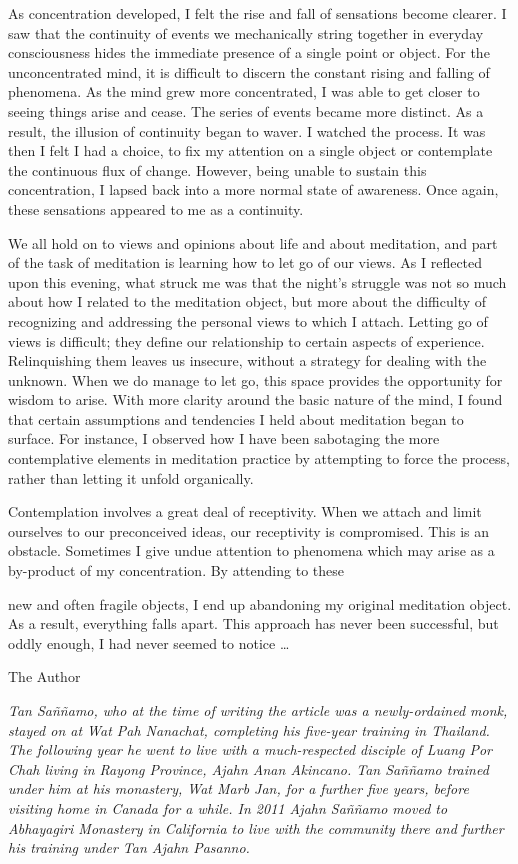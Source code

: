 As concentration developed, I felt the rise and fall of sensations
become clearer. I saw that the continuity of events we mechanically
string together in everyday consciousness hides the immediate presence
of a single point or object. For the unconcentrated mind, it is
difficult to discern the constant rising and falling of phenomena. As
the mind grew more concentrated, I was able to get closer to seeing
things arise and cease. The series of events became more distinct. As a
result, the illusion of continuity began to waver. I watched the
process. It was then I felt I had a choice, to fix my attention on a
single object or contemplate the continuous flux of change. However, 
being unable to sustain this concentration, I lapsed back into a more
normal state of awareness. Once again, these sensations appeared to me
as a continuity. 

We all hold on to views and opinions about life and about meditation, 
and part of the task of meditation is learning how to let go of our
views. As I reflected upon this evening, what struck me was that the
night's struggle was not so much about how I related to the meditation
object, but more about the difficulty of recognizing and addressing the
personal views to which I attach. Letting go of views is difficult; they
define our relationship to certain aspects of experience. Relinquishing
them leaves us insecure, without a strategy for dealing with the
unknown. When we do manage to let go, this space provides the
opportunity for wisdom to arise. With more clarity around the basic
nature of the mind, I found that certain assumptions and tendencies I
held about meditation began to surface. For instance, I observed how I
have been sabotaging the more contemplative elements in meditation
practice by attempting to force the process, rather than letting it
unfold organically. 

Contemplation involves a great deal of receptivity. When we attach and
limit ourselves to our preconceived ideas, our receptivity is
compromised. This is an obstacle. Sometimes I give undue attention to
phenomena which may arise as a by-product of my concentration. By
attending to these

new and often fragile objects, I end up abandoning my original
meditation object. As a result, everything falls apart. This approach
has never been successful, but oddly enough, I had never seemed to
notice \ldots{}

The Author

\emph{Tan Saññamo, who at the time of writing the article was a
newly-ordained monk, stayed on at Wat Pah Nanachat, completing his
five-year training in Thailand. The following year he went to live with
a much-respected disciple of Luang Por Chah living in Rayong Province, 
Ajahn Anan Akincano. Tan Saññamo trained under him at his monastery, Wat
Marb Jan, for a further five years, before visiting home in Canada for a
while. In 2011 Ajahn Saññamo moved to Abhayagiri Monastery in California
to live with the community there and further his training under Tan
Ajahn Pasanno.}

